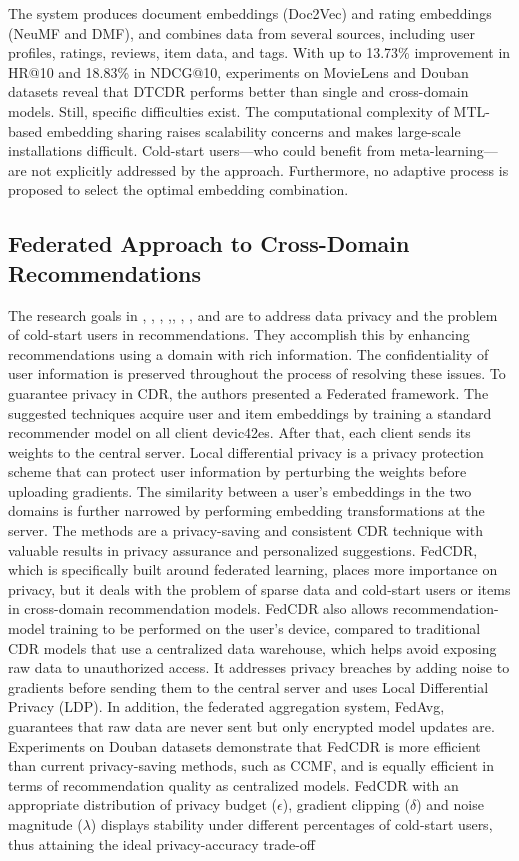 The system produces document embeddings (Doc2Vec) and rating embeddings (NeuMF and DMF), and combines data from several sources, including user profiles, ratings, reviews, item data, and tags. With up to 13.73\% improvement in HR@10 and 18.83\% in NDCG@10, experiments on MovieLens and Douban datasets reveal that DTCDR performs better than single and cross-domain models. Still, specific difficulties exist. The computational complexity of MTL-based embedding sharing raises scalability concerns and makes large-scale installations difficult. Cold-start users---who could benefit from meta-learning---are not explicitly addressed by the approach. Furthermore, no adaptive process is proposed to select the optimal embedding combination.

\subsection{Federated Approach to Cross-Domain Recommendations}
The research goals in \cite{ref42}, \cite{ref43}, \cite{ref44}, \cite{ref45},\cite{ref46}, \cite{ref47}, \cite{ref48} , and \cite{ref8} are to address data privacy and the problem of cold-start users in recommendations. They accomplish this by enhancing recommendations using a domain with rich information. The confidentiality of user information is preserved throughout the process of resolving these issues. To guarantee privacy in CDR, the authors presented a Federated framework. The suggested techniques acquire user and item embeddings by training a standard recommender model on all client devic42es. After that, each client sends its weights to the central server. Local differential privacy is a privacy protection scheme that can protect user information by perturbing the weights before uploading gradients. The similarity between a user's embeddings in the two domains is further narrowed by performing embedding transformations at the server. The methods are a privacy-saving and consistent CDR technique with valuable results in privacy assurance and personalized suggestions. FedCDR, which is specifically built around federated learning, places more importance on privacy, but it deals with the problem of sparse data and cold-start users or items in cross-domain recommendation models. FedCDR also allows recommendation-model training to be performed on the user's device, compared to traditional CDR models that use a centralized data warehouse, which helps avoid exposing raw data to unauthorized access. It addresses privacy breaches by adding noise to gradients before sending them to the central server and uses Local Differential Privacy (LDP). In addition, the federated aggregation system, FedAvg, guarantees that raw data are never sent but only encrypted model updates are. Experiments on Douban datasets demonstrate that FedCDR is more efficient than current privacy-saving methods, such as CCMF, and is equally efficient in terms of recommendation quality as centralized models. FedCDR with an appropriate distribution of privacy budget ($\epsilon$), gradient clipping ($\delta$) and noise magnitude ($\lambda$) displays stability under different percentages of cold-start users, thus attaining the ideal privacy-accuracy trade-off \cite{ref42}

